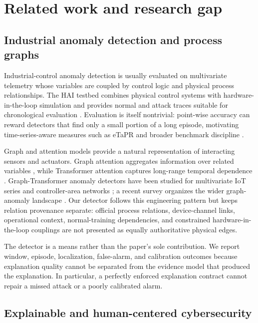 \section{Related work and research gap}
\label{sec:related}

\subsection{Industrial anomaly detection and process graphs}

Industrial-control anomaly detection is usually evaluated on multivariate telemetry whose variables are coupled by control logic and physical process relationships. The HAI testbed combines physical control systems with hardware-in-the-loop simulation and provides normal and attack traces suitable for chronological evaluation \citep{shin2020hai,shin2021two}. Evaluation is itself nontrivial: point-wise accuracy can reward detectors that find only a small portion of a long episode, motivating time-series-aware measures such as eTaPR \citep{hwang2022etapr} and broader benchmark discipline \citep{schmidl2022evaluation}.

Graph and attention models provide a natural representation of interacting sensors and actuators. Graph attention aggregates information over related variables \citep{velickovic2018gat}, while Transformer attention captures long-range temporal dependence \citep{vaswani2017attention}. Graph-Transformer anomaly detectors have been studied for multivariate IoT series \citep{chen2022gta} and controller-area networks \citep{zhou2025cgts}; a recent survey organizes the wider graph-anomaly landscape \citep{qiao2025deep}. Our detector follows this engineering pattern but keeps relation provenance separate: official process relations, device-channel links, operational context, normal-training dependencies, and constrained hardware-in-the-loop couplings are not presented as equally authoritative physical edges.

The detector is a means rather than the paper's sole contribution. We report window, episode, localization, false-alarm, and calibration outcomes because explanation quality cannot be separated from the evidence model that produced the explanation. In particular, a perfectly enforced explanation contract cannot repair a missed attack or a poorly calibrated alarm.

\subsection{Explainable and human-centered cybersecurity}

